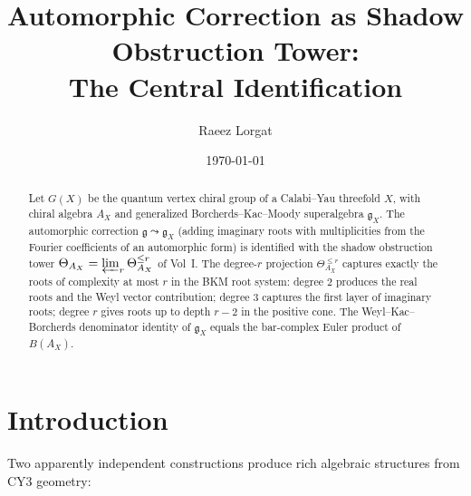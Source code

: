 \documentclass[11pt]{amsart}
\theoremstyle{definition}
\theoremstyle{remark}
\newcommand{\fg}{\mathfrak{g}}
\begin{document}
\title[Automorphic Correction = Shadow Obstruction Tower]
{Automorphic Correction as Shadow Obstruction Tower:\\
The Central Identification}

\author{Raeez Lorgat}

\date{\today}

\begin{abstract}
Let $G(X)$ be the quantum vertex chiral group of a Calabi--Yau
threefold $X$, with chiral algebra $A_X$ and generalized
Borcherds--Kac--Moody superalgebra $\fg_X$. The automorphic
correction $\fg \leadsto \fg_X$ (adding imaginary roots with
multiplicities from the Fourier coefficients of an automorphic
form) is identified with the shadow obstruction tower
$\Theta_{A_X} = \varprojlim_r \Theta^{\leq r}_{A_X}$ of
Vol~I\@. The degree-$r$ projection $\Theta^{\leq r}_{A_X}$
captures exactly the roots of complexity at most $r$ in the BKM
root system: degree $2$ produces the real roots and the Weyl
vector contribution; degree $3$ captures the first layer of
imaginary roots; degree $r$ gives roots up to depth $r - 2$ in
the positive cone. The Weyl--Kac--Borcherds denominator identity
of $\fg_X$ equals the bar-complex Euler product of $B(A_X)$.
\end{abstract}

\maketitle

\tableofcontents

\section{Introduction}\label{sec:intro}

Two apparently independent constructions produce rich algebraic
structures from CY3 geometry:
\end{document}
